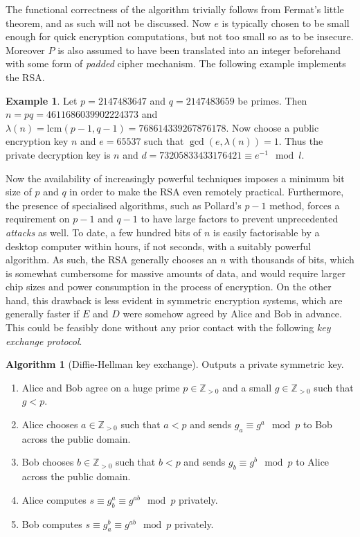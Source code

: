 \documentclass{article}
\newcommand{\Z}{\mathbb{Z}}
\newcommand{\rb}[1]{\left( #1 \right)}
\theoremstyle{definition}
\newtheorem*{example}{Example}
\newtheorem{algorithm}[proposition]{Algorithm}
\begin{document}
The functional correctness of the algorithm trivially follows from Fermat's little theorem, and as such will not be discussed. Now $ e $ is typically chosen to be small enough for quick encryption computations, but not too small so as to be insecure. Moreover $ P $ is also assumed to have been translated into an integer beforehand with some form of \emph{padded} cipher mechanism. The following example implements the RSA.

\begin{example}
Let $ p = 2147483647 $ and $ q = 2147483659 $ be primes. Then $ n = pq = 4611686039902224373 $ and $ \lambda\rb{n} = \text{lcm}\rb{p - 1, q - 1} = 768614339267876178 $. Now choose a public encryption key $ n $ and $ e = 65537 $ such that $ \gcd\rb{e, \lambda\rb{n}} = 1 $. Thus the private decryption key is $ n $ and $ d = 73205833433176421 \equiv e^{-1} \mod l $.
\end{example}

Now the availability of increasingly powerful techniques imposes a minimum bit size of $ p $ and $ q $ in order to make the RSA even remotely practical. Furthermore, the presence of specialised algorithms, such as Pollard's $ p - 1 $ method, forces a requirement on $ p - 1 $ and $ q - 1 $ to have large factors to prevent unprecedented \emph{attacks} as well. To date, a few hundred bits of $ n $ is easily factorisable by a desktop computer within hours, if not seconds, with a suitably powerful algorithm. As such, the RSA generally chooses an $ n $ with thousands of bits, which is somewhat cumbersome for massive amounts of data, and would require larger chip sizes and power consumption in the process of encryption. On the other hand, this drawback is less evident in symmetric encryption systems, which are generally faster if $ E $ and $ D $ were somehow agreed by Alice and Bob in advance. This could be feasibly done without any prior contact with the following \emph{key exchange protocol}.

\begin{algorithm}[Diffie-Hellman key exchange]
Outputs a private symmetric key.
\begin{enumerate}
\item Alice and Bob agree on a huge prime $ p \in \Z_{> 0} $ and a small $ g \in \Z_{> 0} $ such that $ g < p $.
\item Alice chooses $ a \in \Z_{> 0} $ such that $ a < p $ and sends $ g_a \equiv g^a \mod p $ to Bob across the public domain.
\item Bob chooses $ b \in \Z_{> 0} $ such that $ b < p $ and sends $ g_b \equiv g^b \mod p $ to Alice across the public domain.
\item Alice computes $ s \equiv g_b^a \equiv g^{ab} \mod p $ privately.
\item Bob computes $ s \equiv g_a^b \equiv g^{ab} \mod p $ privately.
\end{enumerate}
\end{algorithm}
\end{document}

